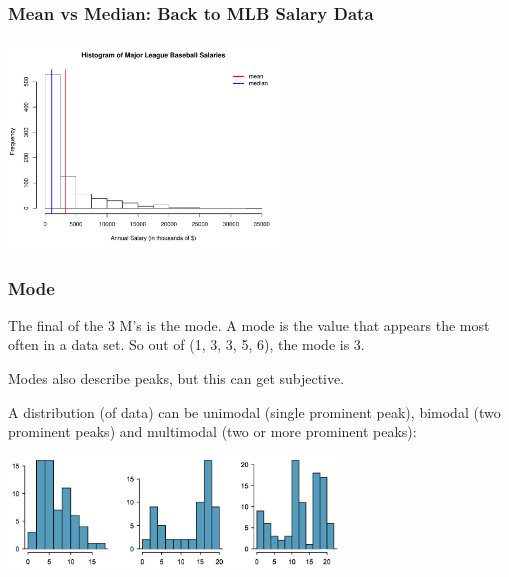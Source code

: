 \documentclass[handout]{beamer}
\newcommand{\blue}[1]{\textcolor{blue2}{#1}}
\begin{document}
\begin{frame}
\frametitle{Mean vs Median: Back to MLB Salary Data}

\begin{center}
\includegraphics[height=5.5cm]{figure/MLB2.pdf}
\end{center}

\end{frame}


\begin{frame}[fragile]
\frametitle{Mode}
The final of the 3 M's is the \blue{mode}.  A mode is the value that appears the most often in a data set.  So out of (1, 3, 3, 5, 6), the mode is 3.  

\vspace{0.25cm}

\pause Modes also describe \blue{peaks}, but this can get subjective. 

\vspace{0.25cm}

\pause A distribution (of data) can be \blue{unimodal} (single prominent peak), \blue{bimodal} (two prominent peaks) and \blue{multimodal} (two or more prominent peaks):

\begin{center}
\includegraphics[height=3cm]{figure/modes.png}
\end{center}

\end{frame}
\end{document}
